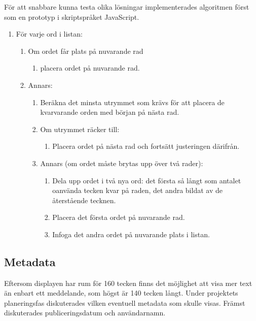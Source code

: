 \documentclass[a4paper,11pt]{article}
\begin{document}
För att snabbare kunna testa olika lösningar implementerades algoritmen först som en prototyp i skriptspråket JavaScript.
	\begin{enumerate}
    	\item För varje ord i listan:
    		\begin{enumerate}
        	\item Om ordet får plats på nuvarande rad
        		\begin{enumerate}
        		\item placera ordet på nuvarande rad.
        		\end{enumerate}
        	\item Annars: 
        		\begin{enumerate}
        		\item Beräkna det minsta utrymmet som krävs för att placera de kvarvarande orden med början på nästa rad. 
        		\item Om utrymmet räcker till:
        			\begin{enumerate}
        			\item Placera ordet på nästa rad och fortsätt justeringen därifrån.
        			\end{enumerate}
            		\item Annars (om ordet måste brytas upp över två rader):
            			\begin{enumerate}
                		\item Dela upp ordet i två nya ord: det första så långt som antalet oanvända tecken kvar på raden, det andra bildat av de återstående tecknen.
                		\item Placera det första ordet på nuvarande rad.
                		\item Infoga det andra ordet på nuvarande plats i listan.
                		\end{enumerate}
                	\end{enumerate}
    		\end{enumerate}
    	\end{enumerate}

\subsection{Metadata}
Eftersom displayen har rum för 160 tecken finns det möjlighet att visa mer text än enbart ett meddelande, som högst är 140 tecken långt. Under projektets planeringsfas diskuterades vilken eventuell metadata som skulle visas. Främst diskuterades publiceringsdatum och användarnamn. \\
\end{document}
